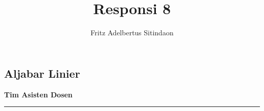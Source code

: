 \documentclass{article}
\title{Responsi 8}
\author{Fritz Adelbertus Sitindaon}
\date{}
\begin{document}
\begin{flushright}
    \section*{Aljabar Linier}
    \textbf{Tim Asisten Dosen}
\end{flushright}


\vspace{0.5cm}\hrule height 2pt\vspace{0.5cm}
\end{document}

